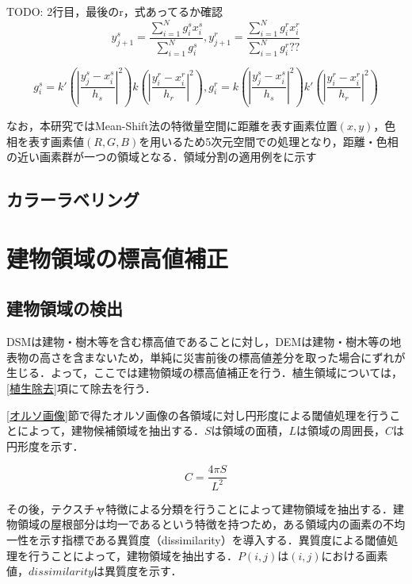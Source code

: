       TODO: 2行目，最後のr，式あってるか確認
      \begin{equation}
        \label{Mean-Shift法2}
        y_{j+1}^s = 
          \dfrac{\sum_{i=1}^{N} g_{i}^s x_{i}^s} {\sum_{i=1}^{N} g_{i}^s}, 
        y_{j+1}^r = 
          \dfrac{\sum_{i=1}^{N} g_{i}^r x_{i}^r} {\sum_{i=1}^{N} g_{i}^r??}
      \end{equation}

      \begin{equation}
        \label{Mean-Shift法3}
        g_{i}^s = k' (|\dfrac{y_{j}^s - x_{i}^s} {h_{s}}|^2)
                  k  (|\dfrac{y_{i}^r - x_{i}^r} {h_{r}}|^2), 
        g_{i}^r = k  (|\dfrac{y_{j}^s - x_{i}^s} {h_{s}}|^2) 
                  k' (|\dfrac{y_{i}^r - x_{i}^r} {h_{r}}|^2)
      \end{equation}

      なお，本研究ではMean-Shift法の特徴量空間に距離を表す画素位置$(x,y)$，色相を表す画素値$(R,G,B)$を用いるため5次元空間での処理となり，距離・色相の近い画素群が一つの領域となる．領域分割の適用例を\fref{}に示す

    \subsection{カラーラベリング}



  \section{建物領域の標高値補正}
    \subsection{建物領域の検出}
    

      DSMは建物・樹木等を含む標高値であることに対し，DEMは建物・樹木等の地表物の高さを含まないため，単純に災害前後の標高値差分を取った場合にずれが生じる．よって，ここでは建物領域の標高値補正を行う．植生領域については，\ref{植生除去}項にて除去を行う．

      \ref{オルソ画像}節で得たオルソ画像の各領域に対し円形度による閾値処理を行うことによって，建物候補領域を抽出する．$S$は領域の面積，$L$は領域の周囲長，$C$は円形度を示す．

      \begin{equation}
        \label{円形度}
        C = \dfrac{4 \pi S} {L^2} 
      \end{equation}

      その後，テクスチャ特徴による分類を行うことによって建物領域を抽出する．建物領域の屋根部分は均一であるという特徴を持つため，ある領域内の画素の不均一性を示す指標である異質度（dissimilarity）\cite{論文手法3}を導入する．異質度による閾値処理を行うことによって，建物領域を抽出する．$P(i,j)$は$(i,j)$における画素値，$dissimilarity$は異質度を示す．

